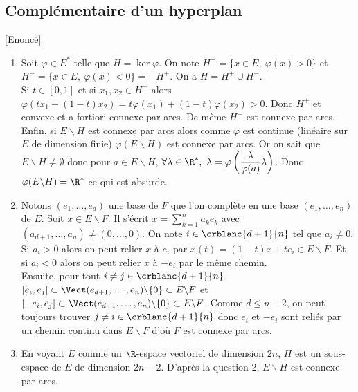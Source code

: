 \documentclass{book}
\begin{document}
	\subsection{Complémentaire d'un hyperplan }
	\label{sec:complementaire-dun-hyperplan}
	\textcolor{blue}{\hyperref[Complémentaire d'un hyperplan]{[Enoncé]}}\\
	\begin{enumerate}[leftmargin=*]
		\item Soit $\varphi\in E^*$ telle que $H=\ker\varphi$. On note $H^+=\{x\in E,\ \varphi(x)>0\}$ et $H^-=\{x\in E,\ \varphi(x)<0\}=-H^+$. On a $H=H^+\cup H^-$.\\
		Si $t\in [0,1]$ et si $x_1,x_2\in H^+$ alors $\varphi(tx_1+(1-t)x_2)=t\varphi(x_1)+(1-t)\varphi(x_2)>0$. Donc $H^+$ et convexe et a fortiori connexe par arcs. De même $H^-$ est connexe par arcs.\\
		Enfin, si $E\backslash H$ est connexe par arcs alors comme $\varphi$ est continue (linéaire sur $E$ de dimension finie) $\varphi(E\backslash H)$ est connexe par arcs. Or on sait que $E\backslash H\ne\emptyset$ donc pour $a\in E\backslash H$, $\forall \lambda\in \R^*,\ \lambda=\varphi\left(\dfrac{\lambda}{\varphi(a)}\lambda\right)$. Donc $\varphi(E\backslash H)=\R^*$ ce qui est absurde.
		\item Notons $(e_1,\dots,e_d)$ une base de $F$ que l'on complète en une base $(e_1,\dots,e_n)$ de $E$. Soit $x\in E\backslash F$. Il s'écrit $x=\displaystyle\sum_{k=1}^na_ke_k$ avec $(a_{d+1},\dots,a_n)\ne (0,\dots,0)$. On note $i\in \crblanc{d+1}{n}$ tel que $a_i\ne 0$. Si $a_i>0$ alors on peut relier $x$ à $e_i$ par $x(t)=(1-t)x+te_i\in E\backslash F$. Et si $a_i<0$ alors on peut relier $x$ à $-e_i$ par le même chemin.\\
		Ensuite, pour tout $i\ne j\in \crblanc{d+1}{n}$, $[e_i,e_j]\subset \Vect(e_{d+1},\dots,e_n)\backslash\{0\}\subset E\backslash F$ et $[-e_i,e_j]\subset \Vect(e_{d+1},\dots,e_n)\backslash\{0\}\subset E\backslash F$. Comme $d\leq n-2$, on peut toujours trouver $j\ne i\in\crblanc{d+1}{n}$ donc $e_i$ et $-e_i$ sont reliés par un chemin continu dans $E\backslash F$ d'où $F$ est connexe par arcs.
		\item En voyant $E$ comme un $\R$-espace vectoriel de dimension $2n$, $H$ est un sous-espace de $E$ de dimension $2n-2$. D'après la question 2, $E\backslash H$ est connexe par arcs.
	\end{enumerate}
	
\end{document}
